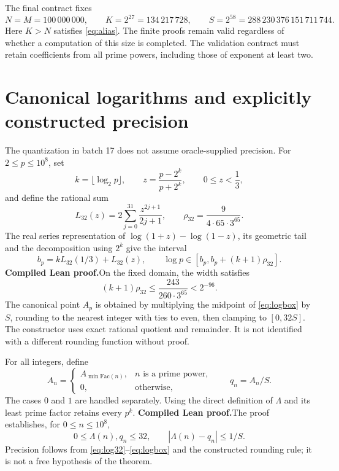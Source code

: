 \documentclass[11pt,a4paper]{article}
\theoremstyle{remark}
\newcommand{\Lam}{\Lambda}
\newcommand{\paid}{\textbf{Compiled Lean proof.}\space}
\begin{document}
The final contract fixes
\begin{equation}\label{eq:fixed}
N=M=100\,000\,000,\qquad K=2^{27}=134\,217\,728,
\qquad S=2^{58}=288\,230\,376\,151\,711\,744.
\end{equation}
Here $K>N$ satisfies \eqref{eq:alias}. The finite proofs remain valid
regardless of whether a computation of this size is completed. The validation
contract must retain coefficients from all prime powers, including those
of exponent at least two.

\clearpage
\section{Canonical logarithms and explicitly constructed precision}\label{sec:quant}
The quantization in batch 17 does not assume oracle-supplied precision.
For $2\le p\le10^8$, set
\[
k=\lfloor\log_2p\rfloor,\qquad
z=\frac{p-2^k}{p+2^k},\qquad 0\le z<\frac13,
\]
and define the rational sum
\begin{equation}\label{eq:log32}
L_{32}(z)=2\sum_{j=0}^{31}\frac{z^{2j+1}}{2j+1},\qquad
\rho_{32}=\frac{9}{4\cdot65\cdot3^{65}}.
\end{equation}
The real series representation of $\log(1+z)-\log(1-z)$, its geometric
tail and the decomposition using $2^k$ give the interval
\begin{equation}\label{eq:logbox}
b_p=kL_{32}(1/3)+L_{32}(z),\qquad
\log p\in[b_p,b_p+(k+1)\rho_{32}].
\end{equation}
\paid On the fixed domain, the width satisfies
\[
(k+1)\rho_{32}\le\frac{243}{260\cdot3^{65}}<2^{-96}.
\]
The canonical point $A_p$ is obtained by multiplying the midpoint of
\eqref{eq:logbox} by $S$, rounding to the nearest integer with ties to even,
then clamping to $[0,32S]$. The constructor uses exact rational quotient
and remainder. It is not identified with a different rounding function
without proof.

For all integers, define
\[
A_n=\begin{cases}
A_{\min\mathrm{Fac}(n)},& n\text{ is a prime power},\\
0,&\text{otherwise},
\end{cases}\qquad q_n=A_n/S.
\]
The cases $0$ and $1$ are handled separately. Using the direct definition
of $\Lam$ and its least prime factor retains every $p^k$.
\paid The proof establishes, for $0\le n\le10^8$,
\begin{equation}\label{eq:q-error}
0\le\Lam(n),q_n\le32,\qquad |\Lam(n)-q_n|\le 1/S.
\end{equation}
Precision follows from \eqref{eq:log32}--\eqref{eq:logbox} and the constructed
rounding rule; it is not a free hypothesis of the theorem.
\end{document}
